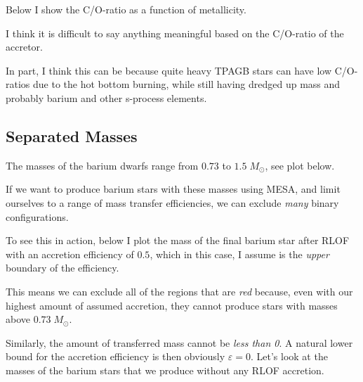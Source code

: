 \documentclass[a4paper,10pt]{article}
\begin{document}
Below I show the C/O-ratio as a function of metallicity.
\begin{figure}[ht]
    \centering
\end{figure}

I think it is difficult to say anything meaningful based on the C/O-ratio of the accretor.

In part, I think this can be because quite heavy TPAGB stars can have low C/O-ratios due to the hot bottom burning, while still having dredged up mass and probably barium and other s-process elements. 




\subsection{Separated Masses}
The masses of the barium dwarfs range from \(0.73\) to \(1.5\;M_\odot \), see plot below.

\begin{figure}[ht]
    \centering
\end{figure}


If we want to produce barium stars with these masses using MESA, and limit ourselves to a range of mass transfer efficiencies, we can exclude \emph{many} binary configurations. 

To see this in action, below I plot the mass of the final barium star after RLOF with an accretion efficiency of \(0.5\), which in this case, I assume is the \emph{upper} boundary of the efficiency.

\begin{figure}[ht]
    \centering
\end{figure}

This means we can exclude all of the regions that are \emph{red} because, even with our highest amount of assumed accretion, they cannot produce stars with masses above \(0.73\;M_\odot \).

Similarly, the amount of transferred mass cannot be \emph{less than 0}. A natural lower bound for the accretion efficiency is then obviously \(\varepsilon =0\). Let's look at the masses of the barium stars that we produce without any RLOF accretion.
\end{document}
